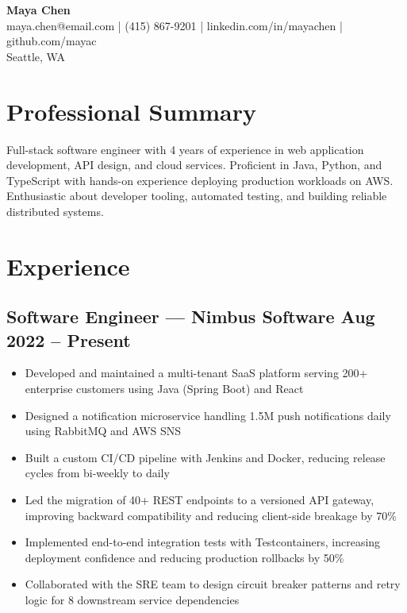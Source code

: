 \documentclass[11pt,a4paper]{article}
\begin{document}
\begin{center}
{\Large \textbf{Maya Chen}} \\
\vspace{2mm}
maya.chen@email.com | (415) 867-9201 | linkedin.com/in/mayachen | github.com/mayac \\
Seattle, WA
\end{center}

\section*{Professional Summary}
Full-stack software engineer with 4 years of experience in web application development, API design, and cloud services. Proficient in Java, Python, and TypeScript with hands-on experience deploying production workloads on AWS. Enthusiastic about developer tooling, automated testing, and building reliable distributed systems.

\section*{Experience}

\subsection*{Software Engineer --- Nimbus Software \hfill Aug 2022 -- Present}
\begin{itemize}[leftmargin=*]
  \item Developed and maintained a multi-tenant SaaS platform serving 200+ enterprise customers using Java (Spring Boot) and React
  \item Designed a notification microservice handling 1.5M push notifications daily using RabbitMQ and AWS SNS
  \item Built a custom CI/CD pipeline with Jenkins and Docker, reducing release cycles from bi-weekly to daily
  \item Led the migration of 40+ REST endpoints to a versioned API gateway, improving backward compatibility and reducing client-side breakage by 70\%
  \item Implemented end-to-end integration tests with Testcontainers, increasing deployment confidence and reducing production rollbacks by 50\%
  \item Collaborated with the SRE team to design circuit breaker patterns and retry logic for 8 downstream service dependencies
\end{itemize}
\end{document}
